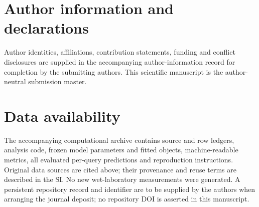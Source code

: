\documentclass[11pt]{article}
\begin{document}
\section*{Author information and declarations}
Author identities, affiliations, contribution statements, funding and conflict disclosures are supplied in the accompanying author-information record for completion by the submitting authors. This scientific manuscript is the author-neutral submission master.

\section*{Data availability}
The accompanying computational archive contains source and row ledgers, analysis code, frozen model parameters and fitted objects, machine-readable metrics, all evaluated per-query predictions and reproduction instructions. Original data sources are cited above; their provenance and reuse terms are described in the SI. No new wet-laboratory measurements were generated. A persistent repository record and identifier are to be supplied by the authors when arranging the journal deposit; no repository DOI is asserted in this manuscript.


\end{document}
